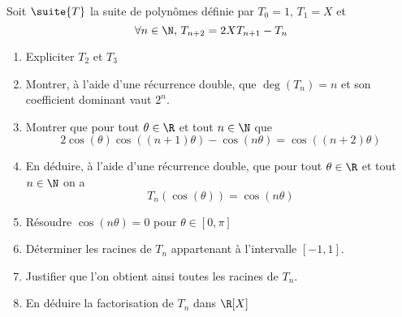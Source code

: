 \documentclass[a4paper, 11pt,reqno]{article}
\begin{document}
\vspace{2cm}
\begin{exercice}
Soit $\suite{T}$ la suite de polynômes définie par 
$T_0 =1, \, T_1=X$ et 
$$\forall n\in \N, \, T_{n+2}=2XT_{n+1} -T_n$$
\begin{enumerate}
\item Expliciter $T_2$ et $T_3$
\item Montrer, à l'aide d'une récurrence double, que $\deg(T_n)=n$ et  son coefficient dominant  vaut $2^n$. 
\item Montrer que pour tout $\theta\in \R$ et tout $n\in \N$ que 
$$2\cos(\theta)\cos((n+1)\theta) -\cos(n\theta) = \cos((n+2)\theta)$$
\item En déduire, à l'aide d'une récurrence double, que pour tout $\theta \in \R$ et tout $n\in \N$ on a 
$$T_n(\cos(\theta))=\cos(n\theta)$$
\item Résoudre $\cos(n\theta) =0$ pour $\theta \in [0,\pi]$
\item Déterminer les racines de $T_n$ appartenant à  l'intervalle $[-1,1]$.
\item Justifier que l'on obtient ainsi toutes les racines de $T_n$. 
\item En déduire la factorisation de $T_n$ dans $\R[X]$
\end{enumerate}
\end{exercice}
\vspace{3cm}
\end{document}
